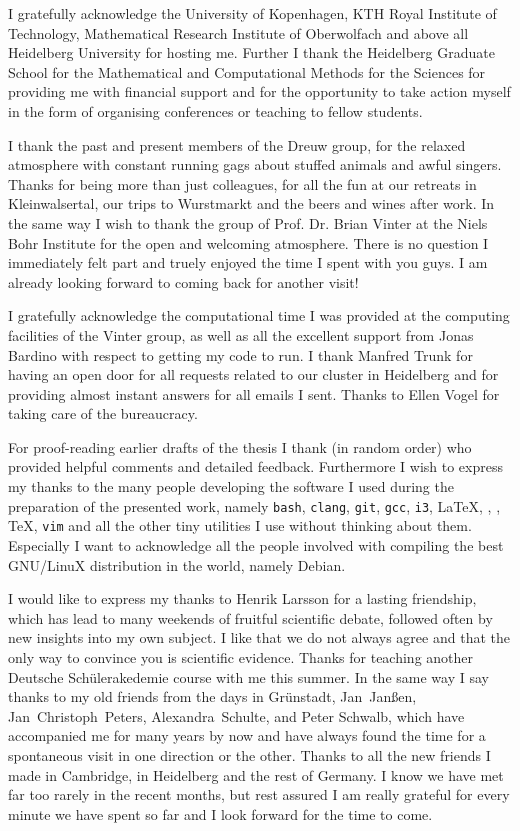 
I gratefully acknowledge
the University of Kopenhagen,
KTH Royal Institute of Technology,
Mathematical Research Institute of Oberwolfach
and above all Heidelberg University for hosting me.
Further I thank the Heidelberg Graduate School
for the Mathematical and Computational Methods for the Sciences
for providing me with financial support
and for the opportunity to take action myself
in the form of organising conferences or teaching to fellow students.

I thank the past and present members of the Dreuw group,
for the relaxed atmosphere
with constant running gags about
stuffed animals and awful singers.
Thanks for being more than just colleagues,
for all the fun
at our retreats in Kleinwalsertal, our trips to Wurstmarkt and
the beers and wines after work.
In the same way I wish to thank
the group of Prof. Dr. Brian Vinter at the Niels Bohr Institute
for the open and welcoming atmosphere.
There is no question I immediately felt part
and truely enjoyed the time I spent with you guys.
I am already looking forward to coming back for another visit!

I gratefully acknowledge the computational time I was provided
at the computing facilities of the Vinter group,
as well as all the excellent support from Jonas Bardino
with respect to getting my code to run.
I thank Manfred Trunk
for having an open door for all requests related
to our cluster in Heidelberg
and for providing almost instant answers for all emails I sent.
Thanks to Ellen Vogel for taking care of the bureaucracy.


For proof-reading earlier drafts of the thesis I thank
(in random order)
%
who provided helpful comments and detailed feedback.
Furthermore I wish to express my thanks to the many people developing
the software I used during the preparation of the presented work,
namely
\texttt{bash},
\texttt{clang},
\texttt{git},
\texttt{gcc},
\texttt{i3},
\LaTeX,
\numpy,
\python,
\TeX,
\texttt{vim}
and all the other tiny utilities I use without thinking about them.
Especially I want to acknowledge all the people
involved with compiling the best 
GNU/LinuX distribution in the world, namely Debian.


I would like to express my thanks to Henrik Larsson
for a lasting friendship,
which has lead to many weekends of fruitful
scientific debate,
followed often by new insights into my own subject.
I like that we do not always agree
and that the only way to convince you is scientific evidence.
Thanks for teaching another Deutsche Schülerakedemie course with me this summer.
In the same way I say thanks to my old friends
from the days in Grünstadt,
Jan~Janßen,
Jan~Christoph~Peters,
Alexandra~Schulte,
and
Peter Schwalb,
which have accompanied me for many years by now
and have always found the time for a spontaneous visit
in one direction or the other.
Thanks to all the new friends I made in Cambridge,
in Heidelberg and the rest of Germany.
I know we have met far too rarely in the recent months,
but rest assured I am really
grateful for every minute we have spent so far
and I look forward for the time to come.

